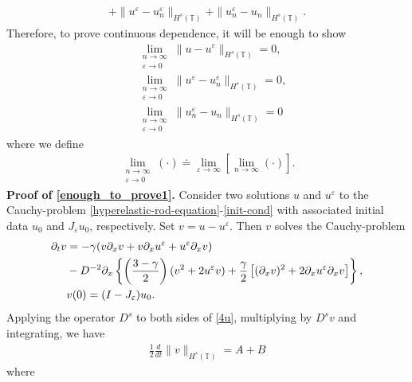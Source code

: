 \documentclass[12pt,reqno]{amsart}
\newcommand{\p}{\partial}
\newcommand{\ci}{\mathbb{T}}
\newcommand{\ee}{\varepsilon}
\theoremstyle{plain}  %
\theoremstyle{definition}
\begin{document}
\begin{appendices}
\begin{equation*}
\begin{split}
		+ \|u^\ee - u^{\ee}_n \|_{H^s(\ci) }
		+  \|u^{\ee}_n - u_n \|_{H^s(\ci)}.
	\end{split}
\end{equation*}
Therefore, to prove continuous dependence, it will be enough to show 
\begin{align}
	& \lim_{\substack{n\to \infty \\ \ee \to 0}} \|u - u^\ee\|_{H^s(\ci)}
	=0,
	\label{enough_to_prove1}
	\\
	& \lim_{\substack{n\to \infty \\ \ee \to 0}} \|u^\ee - u^{\ee}_n
	\|_{H^s(\ci)} = 0,
	\label{enough_to_prove2}
	\\
	& \lim_{\substack{n\to \infty \\ \ee \to 0}}
	\|u^{\ee}_n - u_n \|_{H^s(\ci)} =0
	\label{enough_to_prove3}
\end{align}
where we define 
\medskip
	\begin{equation}
		\label{lim-not}
		\begin{split}
			\lim_{\substack{n\to \infty \\ \ee \to 0}} (\cdot) \doteq \lim_{\ee \to
			\infty} [\lim_{n \to \infty} (\cdot )].
		\end{split}
	\end{equation}
\vskip0.1in
{\bf Proof of \eqref{enough_to_prove1}.}
		Consider two solutions $u $ and $u^\ee$ to the Cauchy-problem
	\eqref{hyperelastic-rod-equation}-\eqref{init-cond}
	with associated initial data $u_0$ and
	$J_\ee u_0$, respectively. Set $v= u -u^\ee $. Then $v$ solves the
	Cauchy-problem
	\begin{align}
		\label{4u}
		\p_t v 
		& =  - \gamma (v \p_x v + v \p_x u^\ee + u^\ee \p_x v)  
		\\
		& - D^{-2} \p_x \left\{ \left (\frac{3-\gamma}{2} \right )(v^2 +
		2u^\ee v) + \frac{\gamma}{2}\left[ (\p_x v)^2 + 2 \p_x u^\ee \p_x v \right]
		\right\}, \notag
		\\
		& v(0) = (I- J_\ee)u_0.
		\label{5u}
	\end{align}
	Applying the operator $D^s$ to both sides of \eqref{4u}, multiplying by
	$D^s v$ and integrating, we have
	\begin{equation}
		\begin{split}
			\frac{1}{2}\frac{d}{dt} \|v\|_{H^s(\ci)} = A + B
			\label{6u}
		\end{split}
	\end{equation}
	where
	\begin{equation}
		\begin{split}

\end{split}
\end{equation}
\end{appendices}
\end{document}
